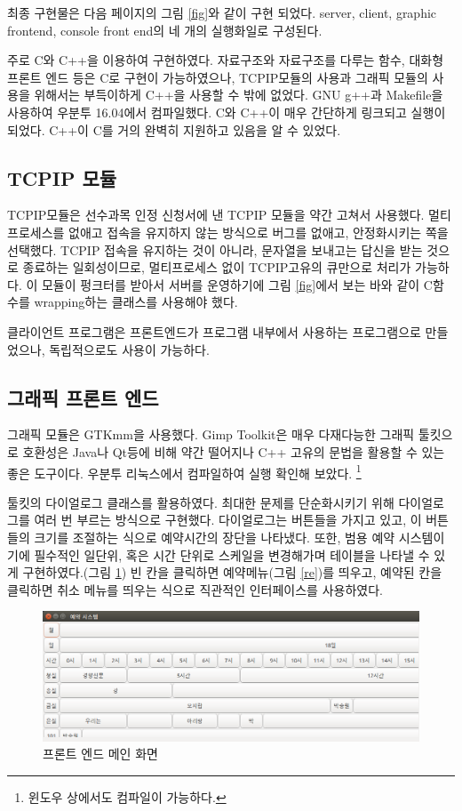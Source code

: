\documentclass[12pt,a4paper]{report}
\begin{document}
최종 구현물은 다음 페이지의 그림 \ref{fig}와 같이 구현 되었다.
server, client, graphic frontend, console front end의 네 개의 실행화일로 구성된다.

주로 C와 C++을 이용하여 구현하였다.
자료구조와 자료구조를 다루는 함수, 대화형 프론트 엔드 등은 C로 구현이 가능하였으나, TCPIP모듈의 사용과 그래픽 모듈의 사용을 위해서는 부득이하게 C++을 사용할 수 밖에 없었다.
GNU g++과 Makefile을 사용하여 우분투 16.04에서 컴파일했다. 
C와 C++이 매우 간단하게 링크되고 실행이 되었다.
C++이 C를 거의 완벽히 지원하고 있음을 알 수 있었다.
\subsection{TCPIP 모듈}
TCPIP모듈은 선수과목 인정 신청서에 낸 TCPIP 모듈을 약간 고쳐서 사용했다. 
멀티프로세스를 없애고 접속을 유지하지 않는 방식으로 버그를 없애고, 안정화시키는 쪽을 선택했다.
TCPIP 접속을 유지하는 것이 아니라, 문자열을 보내고는 답신을 받는 것으로 종료하는 일회성이므로, 멀티프로세스 없이 TCPIP고유의 큐만으로 처리가 가능하다.
이 모듈이 펑크터를 받아서 서버를 운영하기에 그림 \ref{fig}에서 보는 바와 같이 C함수를 
wrapping하는 클래스를 사용해야 했다.

클라이언트 프로그램은 프론트엔드가 프로그램 내부에서 사용하는 프로그램으로 만들었으나, 독립적으로도 사용이 가능하다.
\subsection{그래픽 프론트 엔드}
그래픽 모듈은 GTKmm을 사용했다. 
Gimp Toolkit은 매우 다재다능한 그래픽 툴킷으로 호환성은 Java나 Qt등에 비해 약간 떨어지나 C++ 고유의 문법을 활용할 수 있는 좋은 도구이다.
우분투 리눅스에서 컴파일하여 실행 확인해 보았다.
\footnote{윈도우 상에서도 컴파일이 가능하다.}

툴킷의 다이얼로그 클래스를 활용하였다.
최대한 문제를 단순화시키기 위해 다이얼로그를 여러 번 부르는 방식으로 구현했다.
다이얼로그는 버튼들을 가지고 있고, 이 버튼들의 크기를 조절하는 식으로 예약시간의 장단을 나타냈다.
또한, 범용 예약 시스템이기에 필수적인 일단위, 혹은 시간 단위로 스케일을 변경해가며 테이블을 나타낼 수 있게 구현하였다.(그림 \ref{gf})
빈 칸을 클릭하면 예약메뉴(그림 \ref{re})를 띄우고, 예약된 칸을 클릭하면 취소 메뉴를 띄우는 식으로 직관적인 인터페이스를 사용하였다.

\begin{figure}
	\includegraphics[width=\textwidth]{exec.png}
	\caption{프론트 엔드 메인 화면}\label{gf}
\end{figure}
\end{document}
